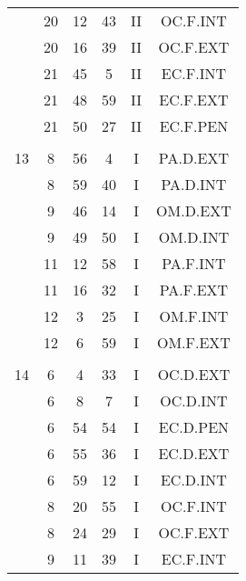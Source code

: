 \documentclass[12pt, a4paper]{article}
\begin{document}
\begin{multicols}{3}
{\begin{tabular}{c c c c c c}
	 	 	 	 & 20 & 12 & 43 & II & OC.F.INT\\%
	 	 	 	 & 20 & 16 & 39 & II & OC.F.EXT\\%
	 	 	 	 & 21 & 45 & 5 & II & EC.F.INT\\%
	 	 	 	 & 21 & 48 & 59 & II & EC.F.EXT\\%
	 	 	 	 & 21 & 50 & 27 & II & EC.F.PEN\\%
	 	 	 	 & & & & & \\%
	 	 	 	13 & 8 & 56 & 4 & I & PA.D.EXT\\%
	 	 	 	 & 8 & 59 & 40 & I & PA.D.INT\\%
	 	 	 	 & 9 & 46 & 14 & I & OM.D.EXT\\%
	 	 	 	 & 9 & 49 & 50 & I & OM.D.INT\\%
	 	 	 	 & 11 & 12 & 58 & I & PA.F.INT\\%
	 	 	 	 & 11 & 16 & 32 & I & PA.F.EXT\\%
	 	 	 	 & 12 & 3 & 25 & I & OM.F.INT\\%
	 	 	 	 & 12 & 6 & 59 & I & OM.F.EXT\\%
	 	 	 	 & & & & & \\%
	 	 	 	14 & 6 & 4 & 33 & I & OC.D.EXT\\%
	 	 	 	 & 6 & 8 & 7 & I & OC.D.INT\\%
	 	 	 	 & 6 & 54 & 54 & I & EC.D.PEN\\%
	 	 	 	 & 6 & 55 & 36 & I & EC.D.EXT\\%
	 	 	 	 & 6 & 59 & 12 & I & EC.D.INT\\%
	 	 	 	 & 8 & 20 & 55 & I & OC.F.INT\\%
	 	 	 	 & 8 & 24 & 29 & I & OC.F.EXT\\%
	 	 	 	 & 9 & 11 & 39 & I & EC.F.INT\\%

\end{tabular}}
\end{multicols}
\end{document}
